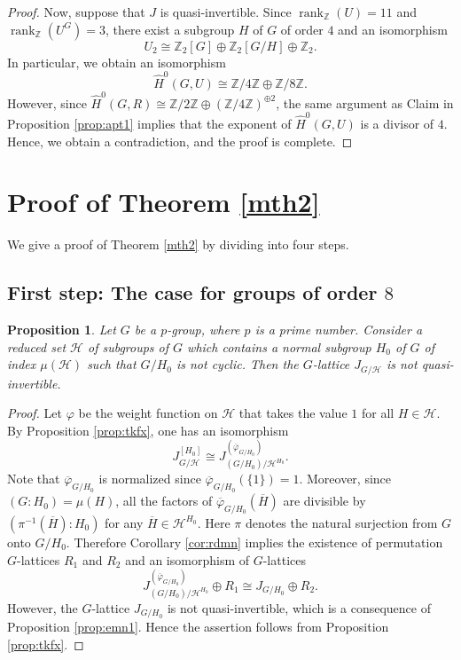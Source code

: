 \documentclass[12pt]{amsart}
\theoremstyle{plain}
\newtheorem{prop}[thm]{Proposition}
\theoremstyle{definition}
\numberwithin{thm}{section}
\numberwithin{equation}{section}
\newcommand{\Z}{\mathbb{Z}}
\newcommand{\cH}{\mathcal{H}}
\newcommand{\Hhat}{\widehat{H}}
\DeclareMathOperator{\rk}{rank}
\begin{document}
\begin{proof}
Now, suppose that $J$ is quasi-invertible. Since $\rk_{\Z}(U)=11$ and $\rk_{\Z}(U^{G})=3$, there exist a subgroup $H$ of $G$ of order $4$ and an isomorphism
\begin{equation*}
    U_{2}\cong \Z_{2}[G]\oplus \Z_{2}[G/H]\oplus \Z_{2}. 
\end{equation*}
In particular, we obtain an isomorphism
\begin{equation*}
    \Hhat^{0}(G,U)\cong \Z/4\Z \oplus \Z/8\Z. 
\end{equation*}
However, since $\Hhat^{0}(G,R)\cong \Z/2\Z\oplus (\Z/4\Z)^{\oplus 2}$, the same argument as Claim in Proposition \ref{prop:apt1} implies that the exponent of $\Hhat^{0}(G,U)$ is a divisor of $4$. Hence, we obtain a contradiction, and the proof is complete. 
\end{proof}

\section{Proof of Theorem \ref{mth2}}\label{sect:pfev}

We give a proof of Theorem \ref{mth2} by dividing into four steps.

\subsection{First step: The case for groups of order $8$}\label{pf21}

\begin{prop}\label{prop:fixd}
Let $G$ be a $p$-group, where $p$ is a prime number. Consider a reduced set $\cH$ of subgroups of $G$ which contains a normal subgroup $H_{0}$ of $G$ of index $\mu(\cH)$ such that $G/H_{0}$ is not cyclic. Then the $G$-lattice $J_{G/\cH}$ is not quasi-invertible. 
\end{prop}

\begin{proof}
Let $\varphi$ be the weight function on $\cH$ that takes the value $1$ for all $H\in \cH$. By Proposition \ref{prop:tkfx}, one has an isomorphism
\begin{equation*}
J_{G/\cH}^{[H_{0}]}\cong J_{(G/H_{0})/\cH^{H_{0}}}^{(\overline{\varphi}_{G/H_{0}})}. 
\end{equation*}
Note that $\overline{\varphi}_{G/H_{0}}$ is normalized since $\overline{\varphi}_{G/H_{0}}(\{1\})=1$. Moreover, since $(G:H_{0})=\mu(H)$, all the factors of $\overline{\varphi}_{G/H_{0}}(\overline{H})$ are divisible by $(\pi^{-1}(\overline{H}):H_{0})$ for any $\overline{H}\in \cH^{H_{0}}$. Here $\pi$ denotes the natural surjection from $G$ onto $G/H_{0}$. Therefore Corollary \ref{cor:rdmn} implies the existence of permutation $G$-lattices $R_{1}$ and $R_{2}$ and an isomorphism of $G$-lattices
\begin{equation*}
J_{(G/H_{0})/\cH^{H_{0}}}^{(\overline{\varphi}_{G/H_{0}})}\oplus R_{1}\cong J_{G/H_{0}}\oplus R_{2}. 
\end{equation*}
However, the $G$-lattice $J_{G/H_{0}}$ is not quasi-invertible, which is a consequence of Proposition \ref{prop:emn1}. Hence the assertion follows from Proposition \ref{prop:tkfx}. %
\end{proof}
\end{document}
